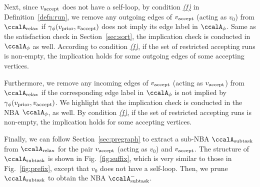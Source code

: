 \documentclass[Afour,sageh,times]{sagej}
\newcommand{\auto}[1]{\ccalA_{\textup{#1}}}
\newcommand{\autop}{\ccalA_{\phi}}
\newcommand{\vertex}[1]{v_{\textup{#1}}}
\begin{document}
{{  Next, since $\vertex{accept}$ does not have a self-loop,  by condition \hyperref[cond:f]{\it (f)} in Definition~\ref{defn:run}, we remove any outgoing edges of $\vertex{accept}$ (acting as $v_0$) from $\auto{relax}$ if $\gamma_{\phi}(\vertex{prior}, \vertex{accept})$ does not imply its edge label in $\autop$. Same as the satisfaction check in Section~\ref{sec:sort}, the implication check is conducted in $\autop$ as well. According to condition \hyperref[cond:f]{\it (f)}, if the set of restricted accepting runs is non-empty, the  implication holds  for some  outgoing edges of some accepting vertices.

  Furthermore, we remove any incoming edges of $\vertex{accept}$ (acting as $\vertex{accept}$) from $\auto{relax}$ if the corresponding edge label in $\autop$ is not implied by $\gamma_\phi(\vertex{prior}, \vertex{accept})$.  We highlight that the implication check is  conducted in the NBA $\autop$, as well. By condition \hyperref[cond:f]{\it (f)}, if the set of restricted accepting runs is non-empty, the implication holds  for some accepting vertices.

  Finally, we can follow Section~\ref{sec:pregraph} to  extract a sub-NBA $\auto{subtask}$ from $\auto{relax}$ for the pair $\vertex{accept}$ (acting as $v_0$) and $\vertex{accept}$. The structure of $\auto{subtask}$ is shown in Fig.~\ref{fig:suffix}, which is very similar to those in Fig.~\ref{fig:prefix}, except that $v_0$ does not have a self-loop.  Then, we prune $\auto{subtask}$ to obtain the NBA $\auto{subtask}^-$.

}}
\end{document}
